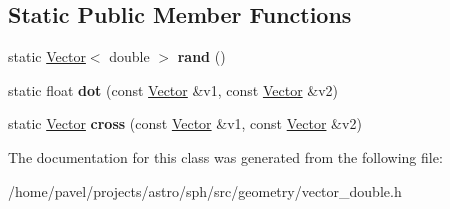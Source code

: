 \subsection*{Static Public Member Functions}
\begin{DoxyCompactItemize}
\item 
\hypertarget{classVector_3_01double_01_4_a0be15d14eeaf730bb6c83498059a5630}{}\label{classVector_3_01double_01_4_a0be15d14eeaf730bb6c83498059a5630} 
static \hyperlink{classVector}{Vector}$<$ double $>$ {\bfseries rand} ()
\item 
\hypertarget{classVector_3_01double_01_4_a74787a437b2c584d3e3f805cd5f68dcb}{}\label{classVector_3_01double_01_4_a74787a437b2c584d3e3f805cd5f68dcb} 
static float {\bfseries dot} (const \hyperlink{classVector}{Vector} \&v1, const \hyperlink{classVector}{Vector} \&v2)
\item 
\hypertarget{classVector_3_01double_01_4_a5dcff243618d97770313befb13a29416}{}\label{classVector_3_01double_01_4_a5dcff243618d97770313befb13a29416} 
static \hyperlink{classVector}{Vector} {\bfseries cross} (const \hyperlink{classVector}{Vector} \&v1, const \hyperlink{classVector}{Vector} \&v2)
\end{DoxyCompactItemize}


The documentation for this class was generated from the following file\+:\begin{DoxyCompactItemize}
\item 
/home/pavel/projects/astro/sph/src/geometry/vector\+\_\+double.\+h\end{DoxyCompactItemize}
